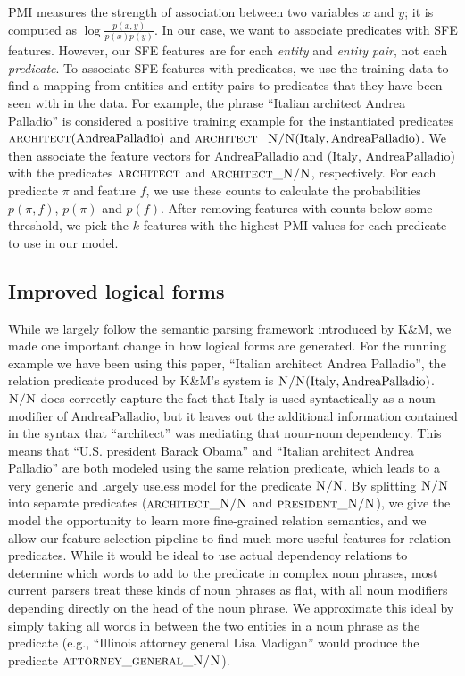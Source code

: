 \documentclass[11pt]{article}
\newcommand{\predicate}[1]{\ensuremath{\textsc{#1}}}
\newcommand{\entity}[1]{\ensuremath{\mathrm{#1}}}
\begin{document}
PMI measures the strength of association between two variables $x$ and $y$; it
is computed as $\log\frac{p(x,y)}{p(x)p(y)}$.  In our case, we want to
associate predicates with SFE features.  However, our SFE features are for each
\emph{entity} and \emph{entity pair}, not each \emph{predicate}.  To associate
SFE features with predicates, we use the training data to find a mapping from
entities and entity pairs to predicates that they have been seen with in the
data.  For example, the phrase ``Italian architect Andrea Palladio'' is
considered a positive training example for the instantiated predicates
$\predicate{architect}(\entity{Andrea Palladio})$ and
$\predicate{architect\_N/N}(\entity{Italy}, \entity{Andrea Palladio})$.  We
then associate the feature vectors for \entity{Andrea Palladio} and
(\entity{Italy}, \entity{Andrea Palladio}) with the predicates
\predicate{architect} and \predicate{architect\_N/N}, respectively.  For each
predicate $\pi$ and feature $f$, we use these counts to calculate the
probabilities $p(\pi, f)$, $p(\pi)$ and $p(f)$.  After removing features with
counts below some threshold, we pick the $k$ features with the highest PMI
values for each predicate to use in our model.

\subsection{Improved logical forms}
\label{sec:better-lfs}

While we largely follow the semantic parsing framework introduced by K\&M, we
made one important change in how logical forms are generated.  For the running
example we have been using this paper, ``Italian architect Andrea Palladio'',
the relation predicate produced by K\&M's system is
$\predicate{N/N}(\entity{Italy}, \entity{Andrea Palladio})$.  \predicate{N/N}
does correctly capture the fact that \entity{Italy} is used syntactically as a
noun modifier of \entity{Andrea Palladio}, but it leaves out the additional
information contained in the syntax that ``architect'' was mediating that
noun-noun dependency.  This means that ``U.S. president Barack Obama'' and
``Italian architect Andrea Palladio'' are both modeled using the same relation
predicate, which leads to a very generic and largely useless model for the
predicate \predicate{N/N}.  By splitting \predicate{N/N} into separate
predicates (\predicate{architect\_N/N} and \predicate{president\_N/N}), we give
the model the opportunity to learn more fine-grained relation semantics, and we
allow our feature selection pipeline to find much more useful features for
relation predicates.  While it would be ideal to use actual dependency
relations to determine which words to add to the predicate in complex noun
phrases, most current parsers treat these kinds of noun phrases as flat, with
all noun modifiers depending directly on the head of the noun phrase.  We
approximate this ideal by simply taking all words in between the two entities
in a noun phrase as the predicate (e.g., ``Illinois attorney general Lisa
Madigan'' would produce the predicate \predicate{attorney\_general\_N/N}).
\end{document}
